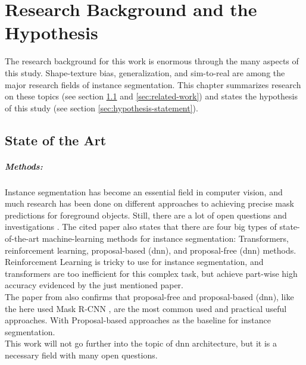 
\chapter{Research Background and the Hypothesis}
\label{chap:kapitel2}

	The research background for this work is enormous through the many aspects of this study. Shape-texture bias, generalization, and sim-to-real are among the major research fields of instance segmentation. This chapter summarizes research on these topics (see section \ref{sec:state-of-the-art} and \ref{sec:related-work}) and states the hypothesis of this study (see section \ref{sec:hypothesis-statement}).

	\section{State of the Art}
	\label{sec:state-of-the-art}
		\paragraph{Methods:} Instance segmentation has become an essential field in computer vision, and much research has been done on different approaches to achieving precise mask predictions for foreground objects. Still, there are a lot of open questions and investigations \cite{Sharma2022}. The cited paper also states that there are four big types of state-of-the-art machine-learning methods for instance segmentation: Transformers, reinforcement learning, proposal-based (\ac{dnn}), and proposal-free (\ac{dnn}) methods.\\
		Reinforcement Learning is tricky to use for instance segmentation, and transformers are too inefficient for this complex task, but achieve part-wise high accuracy evidenced by the just mentioned paper.\\
		The paper from \citeauthor{Sharma2022} also confirms that proposal-free and proposal-based (\ac{dnn}), like the here used Mask R-CNN \cite{Kaiming2017}, are the most common used and practical useful approaches. With Proposal-based approaches as the baseline for instance segmentation.\\
		This work will not go further into the topic of \ac{dnn} architecture, but it is a necessary field with many open questions.
		\clearpage
